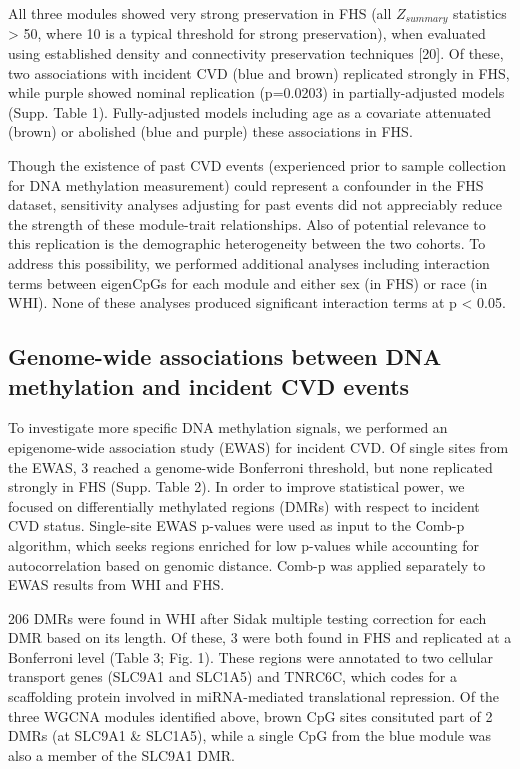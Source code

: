 \documentclass[]{article}
\theoremstyle{definition}
\theoremstyle{definition}
\theoremstyle{definition}
\theoremstyle{remark}
\begin{document}
All three modules showed very strong preservation in FHS (all
\(Z_{summary}\) statistics \textgreater{} 50, where 10 is a typical
threshold for strong preservation), when evaluated using established
density and connectivity preservation techniques {[}20{]}. Of these, two
associations with incident CVD (blue and brown) replicated strongly in
FHS, while purple showed nominal replication (p=0.0203) in
partially-adjusted models (Supp. Table 1). Fully-adjusted models
including age as a covariate attenuated (brown) or abolished (blue and
purple) these associations in FHS.

Though the existence of past CVD events (experienced prior to sample
collection for DNA methylation measurement) could represent a confounder
in the FHS dataset, sensitivity analyses adjusting for past events did
not appreciably reduce the strength of these module-trait relationships.
Also of potential relevance to this replication is the demographic
heterogeneity between the two cohorts. To address this possibility, we
performed additional analyses including interaction terms between
eigenCpGs for each module and either sex (in FHS) or race (in WHI). None
of these analyses produced significant interaction terms at p
\textless{} 0.05.

\subsection{Genome-wide associations between DNA methylation and
incident CVD
events}\label{genome-wide-associations-between-dna-methylation-and-incident-cvd-events}

To investigate more specific DNA methylation signals, we performed an
epigenome-wide association study (EWAS) for incident CVD. Of single
sites from the EWAS, 3 reached a genome-wide Bonferroni threshold, but
none replicated strongly in FHS (Supp. Table 2). In order to improve
statistical power, we focused on differentially methylated regions
(DMRs) with respect to incident CVD status. Single-site EWAS p-values
were used as input to the Comb-p algorithm, which seeks regions enriched
for low p-values while accounting for autocorrelation based on genomic
distance. Comb-p was applied separately to EWAS results from WHI and
FHS.

206 DMRs were found in WHI after Sidak multiple testing correction for
each DMR based on its length. Of these, 3 were both found in FHS and
replicated at a Bonferroni level (Table 3; Fig. 1). These regions were
annotated to two cellular transport genes (SLC9A1 and SLC1A5) and
TNRC6C, which codes for a scaffolding protein involved in miRNA-mediated
translational repression. Of the three WGCNA modules identified above,
brown CpG sites consituted part of 2 DMRs (at SLC9A1 \& SLC1A5), while
a single CpG from the blue module was also a member of the SLC9A1 DMR.
\end{document}
